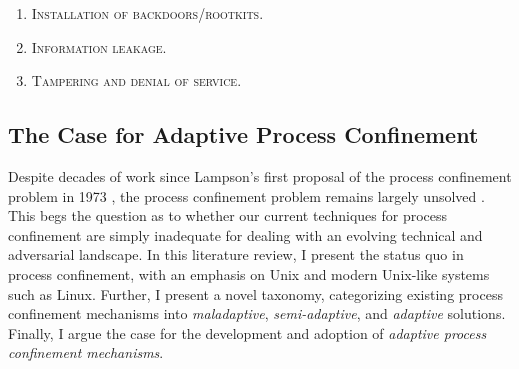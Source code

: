 \documentclass[dvipsnames, 12pt]{article}
\begin{document}
\begin{enumerate}[label=\bfseries G\arabic*., ref=G\arabic*, labelindent=2em]
    \item \label{g:1} \textsc{Installation of backdoors/rootkits.} 

    \item \label{g:2} \textsc{Information leakage.} 

    \item \label{g:3} \textsc{Tampering and denial of service.} 
\end{enumerate}


\subsection{The Case for Adaptive Process Confinement}

Despite decades of work since Lampson's first proposal of the process
confinement problem in 1973 \cite{lampson1973_a_note}, the process confinement
problem remains largely unsolved \cite{crowell2013_confinement_problem}. This
begs the question as to whether our current techniques for process confinement
are simply inadequate for dealing with an evolving technical and adversarial
landscape. In this literature review, I present the status quo in process
confinement, with an emphasis on Unix and modern Unix-like systems such as
Linux.  Further, I present a novel taxonomy, categorizing existing process
confinement mechanisms into \textit{maladaptive}, \textit{semi-adaptive}, and
\textit{adaptive} solutions. Finally, I argue the case for the development and
adoption of \textit{adaptive process confinement mechanisms}.
\end{document}
